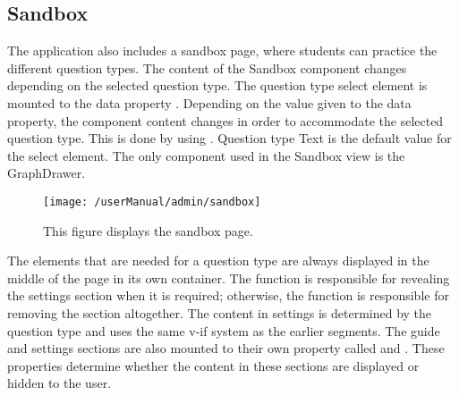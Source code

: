 \subsection{Sandbox}
The application also includes a sandbox page, where students can practice the different question types. The content of the Sandbox component changes depending on the selected question type. The question type select element is mounted to the data property . Depending on the value given to the  data property, the component content changes in order to accommodate the selected question type. This is done by using . Question type Text is the default value for the select element. The only component used in the Sandbox view is the GraphDrawer.

\begin{figure}[H]
	\centering	
	\texttt{[image: /userManual/admin/sandbox]}
	\caption{This figure displays the sandbox page.}
	\label{fig:sandbox}
\end{figure}

\noindent
The elements that are needed for a question type are always displayed in the middle of the page in its own container. The  function is responsible for revealing the settings section when it is required; otherwise, the function is responsible for removing the section altogether.  The content in settings is determined by the question type and uses the same v-if system as the earlier segments. The guide and settings sections are also mounted to their own property called  and . These properties determine whether the content in these sections are displayed or hidden to the user.
